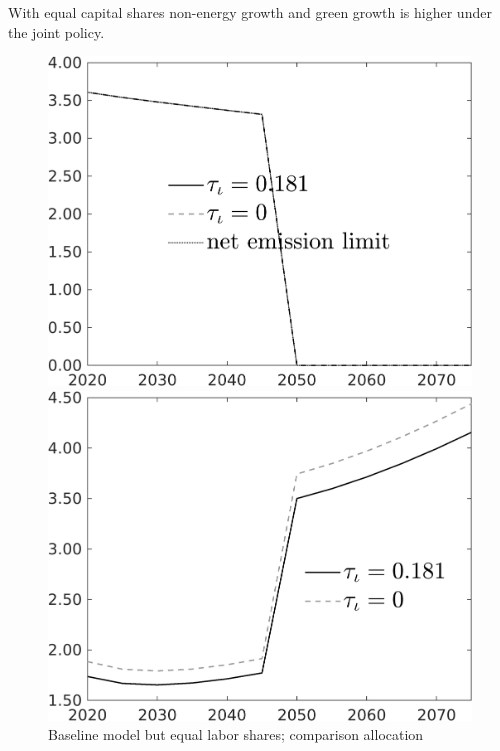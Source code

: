 \documentclass[12pt]{article}
\begin{document}
With equal capital shares non-energy growth and green growth is higher under the joint policy. 
\begin{figure}[h!!]
	\centering
	\caption{Baseline model but equal labor shares; comparison allocation}\label{fig:Leveltauf_nsk1_xgr0_noknow_equallab_notaul}
	\begin{minipage}[]{0.32\textwidth}
		\includegraphics[width=1\textwidth]{../../codding_model/own_basedOnFried/optimalPol_010922_revision/figures/all_13Sept22/CompTauf_bytaul_Equlab_Reg0_Emnet_spillover0_nsk0_xgr0_knspil0_sep1_LFlimit1_emsbase0_countec0_GovRev0_etaa0.79_lgd1.png}
	\end{minipage}		
	\begin{minipage}[]{0.32\textwidth}
		\includegraphics[width=1\textwidth]{../../codding_model/own_basedOnFried/optimalPol_010922_revision/figures/all_13Sept22/CompTauf_bytaul_Equlab_Reg0_tauf_spillover0_nsk0_xgr0_knspil0_sep1_LFlimit1_emsbase0_countec0_GovRev0_etaa0.79_lgd1.png}

\end{minipage}
\end{figure}
\end{document}
